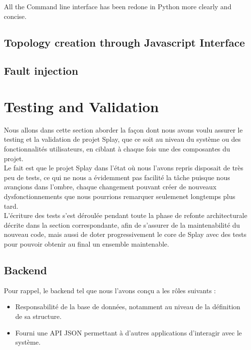 \documentclass{eplmastersthesis}
\begin{document}
      All the Command line interface has been redone in Python more clearly and concise.

    \section{Topology creation through Javascript Interface}

    \section{Fault injection}



  \chapter{Testing and Validation}

    Nous allons dans cette section aborder la façon dont nous avons voulu assurer
    le testing et la validation de projet Splay, que ce soit au niveau du système
    ou des fonctionnalités utilisateurs, en ciblant à chaque fois une des
    composantes du projet.\\

    Le fait est que le projet Splay dans l'état où nous l'avons repris disposait
    de très peu de tests, ce qui ne nous a évidemment pas facilité la tâche puisque
    nous avançions dans l'ombre, chaque changement pouvant créer de nouveaux
    dysfonctionnements que nous pourrions remarquer seulemenet longtemps plus tard.\\

    L'écriture des tests s'est déroulée pendant toute la phase de refonte
    architecturale décrite dans la section correspondante, afin de s'assurer
    de la maintenabilité du nouveau code, mais aussi de doter progressivement
    le core de Splay avec des tests pour pouvoir obtenir au final un ensemble
    maintenable.\\

    \section{Backend}

      Pour rappel, le backend tel que nous l'avons conçu a les rôles suivants :
      \begin{itemize}
        \item Responsabilité de la base de données, notamment au niveau de
        la définition de sa structure.
        \item Fourni une API JSON permettant à d'autres applications d'interagir
        avec le système.
      \end{itemize}
\end{document}
